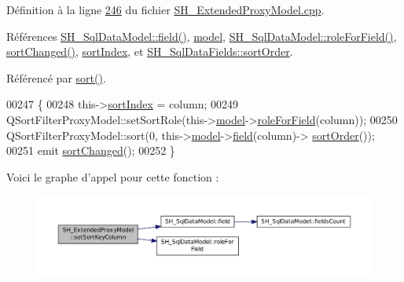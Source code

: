 Définition à la ligne \hyperlink{SH__ExtendedProxyModel_8cpp_source_l00246}{246} du fichier \hyperlink{SH__ExtendedProxyModel_8cpp_source}{S\-H\-\_\-\-Extended\-Proxy\-Model.\-cpp}.



Références \hyperlink{classSH__SqlDataModel_a442cdea9007cb61ed9d2fbdd01ddccbf}{S\-H\-\_\-\-Sql\-Data\-Model\-::field()}, \hyperlink{classSH__ExtendedProxyModel_a8c8b8930c6b1abd9bbb1dce1fdc9690b}{model}, \hyperlink{classSH__SqlDataModel_a0e05155c3c22c6fef7b91ec57d383ae5}{S\-H\-\_\-\-Sql\-Data\-Model\-::role\-For\-Field()}, \hyperlink{classSH__ExtendedProxyModel_a573590c2763d06d07c6509d4c91a06b2}{sort\-Changed()}, \hyperlink{classSH__ExtendedProxyModel_a83cabe4cf90a26d26c4aaa40e944b2bd}{sort\-Index}, et \hyperlink{classSH__SqlDataFields_aec4483df7b9edfe22100985047d97bdd}{S\-H\-\_\-\-Sql\-Data\-Fields\-::sort\-Order}.



Référencé par \hyperlink{classSH__ExtendedProxyModel_a5ed9b14df78667efe8b22d19617d6c4b}{sort()}.


\begin{DoxyCode}
00247 \{
00248     this->\hyperlink{classSH__ExtendedProxyModel_a83cabe4cf90a26d26c4aaa40e944b2bd}{sortIndex} = column;
00249     QSortFilterProxyModel::setSortRole(this->\hyperlink{classSH__ExtendedProxyModel_a8c8b8930c6b1abd9bbb1dce1fdc9690b}{model}->\hyperlink{classSH__SqlDataModel_a0e05155c3c22c6fef7b91ec57d383ae5}{roleForField}(column));
00250     QSortFilterProxyModel::sort(0, this->\hyperlink{classSH__ExtendedProxyModel_a8c8b8930c6b1abd9bbb1dce1fdc9690b}{model}->\hyperlink{classSH__SqlDataModel_a442cdea9007cb61ed9d2fbdd01ddccbf}{field}(column)->
      \hyperlink{classSH__SqlDataFields_aec4483df7b9edfe22100985047d97bdd}{sortOrder}());
00251     emit \hyperlink{classSH__ExtendedProxyModel_a573590c2763d06d07c6509d4c91a06b2}{sortChanged}();
00252 \}
\end{DoxyCode}


Voici le graphe d'appel pour cette fonction \-:\nopagebreak
\begin{figure}[H]
\begin{center}
\leavevmode
\includegraphics[width=350pt]{classSH__ExtendedProxyModel_ad1eb97a28d23e9aba8174bd5ffd7a5e4_cgraph}
\end{center}
\end{figure}




